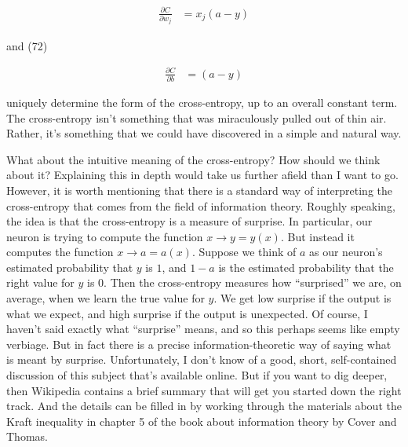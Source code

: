 \begin{align*}
\frac{\partial C}{\partial w_j} &= x_j(a-y) \nonumber
\end{align*}

\noindent and (72)

\begin{align*}
\frac{\partial C}{\partial b } &= (a-y) \nonumber
\end{align*}

\noindent uniquely determine the form of the cross-entropy, up to an overall constant term. The cross-entropy isn't something that was miraculously pulled out of thin air. Rather, it's something that we could have discovered in a simple and natural way.


What about the intuitive meaning of the cross-entropy? How should we think about it? Explaining this in depth would take us further afield than I want to go. However, it is worth mentioning that there is a standard way of interpreting the cross-entropy that comes from the field of information theory. Roughly speaking, the idea is that the cross-entropy is a measure of surprise. In particular, our neuron is trying to compute the function $x \rightarrow y = y(x)$. But instead it computes the function $x \rightarrow a = a(x)$. Suppose we think of $a$ as our neuron's estimated probability that $y$ is $1$, and $1-a$ is the estimated probability that the right value for $y$ is $0$. Then the cross-entropy measures how ``surprised'' we are, on average, when we learn the true value for $y$. We get low surprise if the output is what we expect, and high surprise if the output is unexpected. Of course, I haven't said exactly what ``surprise'' means, and so this perhaps seems like empty verbiage. But in fact there is a precise information-theoretic way of saying what is meant by surprise. Unfortunately, I don't know of a good, short, self-contained discussion of this subject that's available online. But if you want to dig deeper, then Wikipedia contains a brief summary that will get you started down the right track. And the details can be filled in by working through the materials about the Kraft inequality in chapter 5 of the book about information theory by Cover and Thomas.



